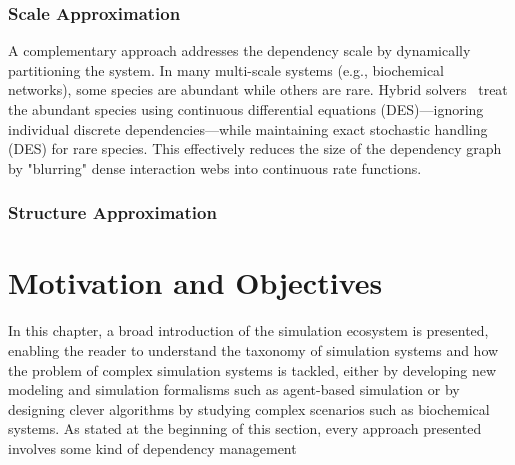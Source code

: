 \subsubsection{Scale Approximation}

A complementary approach addresses the dependency scale by dynamically
partitioning the system. In many multi-scale systems (e.g., biochemical
networks), some species are abundant while others are rare. Hybrid
solvers~\cite{haseltine2002ASCFSRSCK} treat the abundant species using
continuous differential equations (\ac{DES})—ignoring individual discrete
dependencies—while maintaining exact stochastic handling (\ac{DES}) for rare
species. This effectively reduces the size of the dependency graph by
"blurring" dense interaction webs into continuous rate functions.

\subsubsection{Structure Approximation}


\section{Motivation and Objectives}
In this chapter, a broad introduction of the simulation ecosystem is presented,
enabling the reader to understand the taxonomy of simulation systems and how
the problem of complex simulation systems is tackled, either by developing new
modeling and simulation formalisms such as agent-based simulation
or by designing clever algorithms by studying complex scenarios such as
biochemical systems. As stated at the beginning of this section, every
approach presented involves some kind of dependency management

